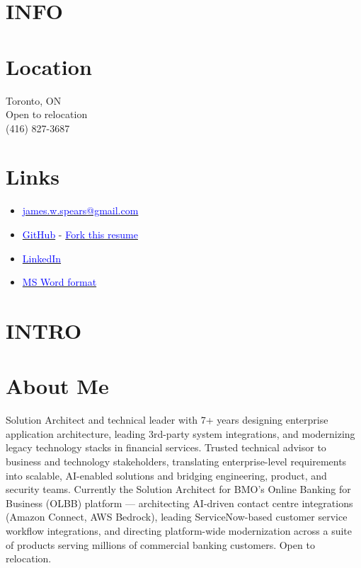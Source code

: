 \documentclass[margin]{res}
\begin{document}
\name{\textcolor{NavyBlue}{James Spears} \textcolor{black}{\bf Solution Architect $\mid$ Integrations \& AI Solutions $\mid$ Financial Services} }

\begin{resume}

	\section{\textcolor{NavyBlue}{INFO}}

	\normalsize{\section{Location}}
	{Toronto, ON \\ Open to relocation \\ (416) 827-3687}

	\normalsize{\section{Links}}
	\begin{itemize}
		\item \href{mailto:james.w.spears@gmail.com}{\textcolor{blue}{james.w.spears@gmail.com}}
		\item \href{https://github.com/james-spears}{\textcolor{blue}{GitHub}} - \href{https://github.com/james-spears/resume}{\textcolor{blue}{Fork this resume}}
		\item \href{https://www.linkedin.com/in/james-spears-50834b8a/}{\textcolor{blue}{LinkedIn}}
		\item \href{https://s3.amazonaws.com/james-spears.com/resume.docx}{\textcolor{blue}{MS Word format}}
	\end{itemize}

	\section{\textcolor{NavyBlue}{INTRO}}

	\normalsize{\section{About Me}}
	Solution Architect and technical leader with 7+ years designing enterprise application architecture, leading 3rd-party system integrations, and modernizing legacy technology stacks in financial services.
	Trusted technical advisor to business and technology stakeholders, translating enterprise-level requirements into scalable, AI-enabled solutions and bridging engineering, product, and security teams.
	Currently the Solution Architect for BMO's Online Banking for Business (OLBB) platform — architecting AI-driven contact centre integrations (Amazon Connect, AWS Bedrock), leading ServiceNow-based customer service workflow integrations, and directing platform-wide modernization across a suite of products serving millions of commercial banking customers.
	Open to relocation.

\end{resume}
\end{document}
